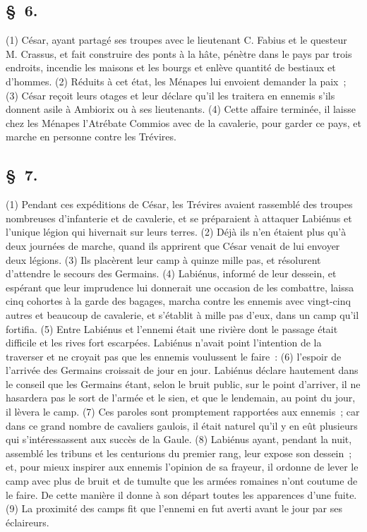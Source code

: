 \documentclass[french,twoside]{book} %
\begin{document}
\subsection[{§ 6.}]{ \textsc{§ 6.} }
\noindent (1) César, ayant partagé ses troupes avec le lieutenant C. Fabius et le questeur M. Crassus, et fait construire des ponts à la hâte, pénètre dans le pays par trois endroits, incendie les maisons et les bourgs et enlève quantité de bestiaux et d’hommes. (2) Réduits à cet état, les Ménapes lui envoient demander la paix ; (3) César reçoit leurs otages et leur déclare qu’il les traitera en ennemis s’ils donnent asile à Ambiorix ou à ses lieutenants. (4) Cette affaire terminée, il laisse chez les Ménapes l’Atrébate Commios avec de la cavalerie, pour garder ce pays, et marche en personne contre les Trévires.
\subsection[{§ 7.}]{ \textsc{§ 7.} }
\noindent (1) Pendant ces expéditions de César, les Trévires avaient rassemblé des troupes nombreuses d’infanterie et de cavalerie, et se préparaient à attaquer Labiénus et l’unique légion qui hivernait sur leurs terres. (2) Déjà ils n’en étaient plus qu’à deux journées de marche, quand ils apprirent que César venait de lui envoyer deux légions. (3) Ils placèrent leur camp à quinze mille pas, et résolurent d’attendre le secours des Germains. (4) Labiénus, informé de leur dessein, et espérant que leur imprudence lui donnerait une occasion de les combattre, laissa cinq cohortes à la garde des bagages, marcha contre les ennemis avec vingt-cinq autres et beaucoup de cavalerie, et s’établit à mille pas d’eux, dans un camp qu’il fortifia. (5) Entre Labiénus et l’ennemi était une rivière dont le passage était difficile et les rives fort escarpées. Labiénus n’avait point l’intention de la traverser et ne croyait pas que les ennemis voulussent le faire : (6) l’espoir de l’arrivée des Germains croissait de jour en jour. Labiénus déclare hautement dans le conseil que les Germains étant, selon le bruit public, sur le point d’arriver, il ne hasardera pas le sort de l’armée et le sien, et que le lendemain, au point du jour, il lèvera le camp. (7) Ces paroles sont promptement rapportées aux ennemis ; car dans ce grand nombre de cavaliers gaulois, il était naturel qu’il y en eût plusieurs qui s’intéressassent aux succès de la Gaule. (8) Labiénus ayant, pendant la nuit, assemblé les tribuns et les centurions du premier rang, leur expose son dessein ; et, pour mieux inspirer aux ennemis l’opinion de sa frayeur, il ordonne de lever le camp avec plus de bruit et de tumulte que les armées romaines n’ont coutume de le faire. De cette manière il donne à son départ toutes les apparences d’une fuite. (9) La proximité des camps fit que l’ennemi en fut averti avant le jour par ses éclaireurs.
\end{document}
